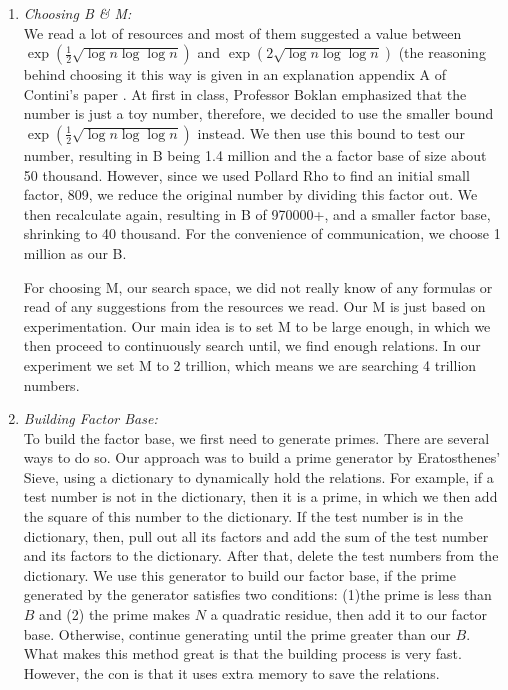 \documentclass[12pt]{article} %
\newcommand{\itemgap}[1][2]{\vspace{#1mm}}
\begin{document}
	
	\renewcommand\labelenumi{\Roman{enumi}}
	\begin{enumerate}
		\item \textit{Choosing B \& M:} \itemgap
		\\ We read a lot of resources and most of them suggested a value between $\exp{(\frac{1}{2}\sqrt{\log{n}\log{\log{n}}})}$ and $\exp{(2\sqrt{\log{n}\log{\log{n}}})}$ (the reasoning behind choosing it this way is given in an explanation appendix A of Contini's paper \cite{contini}. At first in class, Professor Boklan emphasized that the number is just a toy number, therefore, we decided to use the smaller bound $\exp{(\frac{1}{2}\sqrt{\log{n}\log{\log{n}}})}$ instead. We then use this bound to test our number, resulting in B being 1.4 million and the a factor base of size about 50 thousand. However, since we used Pollard Rho to find an initial small factor, 809, we reduce the original number by dividing this factor out. We then recalculate again, resulting in B of 970000+, and a smaller factor base, shrinking to 40 thousand. For the convenience of communication, we choose 1 million as our B. 
		
		For choosing M, our search space, we did not really know of any formulas or read of any suggestions from the resources we read. Our M is just based on experimentation. Our main idea is to set M to be large enough, in which we then proceed to continuously search until, we find enough relations. In our experiment we set M to 2 trillion, which means we are searching 4 trillion numbers.
		
		\item \textit{Building Factor Base:} \itemgap
		\\ To build the factor base, we first need to generate primes. There are several ways to do so. Our approach was to build a prime generator by Eratosthenes' Sieve, using a dictionary to dynamically hold the relations. For example, if a test number is not in the dictionary, then it is a prime, in which we then add the square of this number to the dictionary. If the test number is in the dictionary, then, pull out all its factors and add the sum of the test number and its factors to the dictionary. After that, delete the test numbers from the dictionary. We use this generator to build our factor base, if the prime generated by the generator satisfies two conditions: (1)the prime is less than $B$ and (2) the prime makes $N$ a quadratic residue, then add it to our factor base. Otherwise, continue generating until the prime greater than our $B$. What makes this method great is that the building process is very fast. However, the con is that it uses extra memory to save the relations.
		

\end{enumerate}
\end{document}
